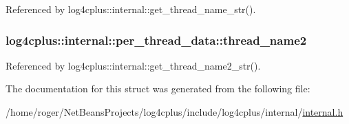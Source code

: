 Referenced by log4cplus\-::internal\-::get\-\_\-thread\-\_\-name\-\_\-str().

\hypertarget{structlog4cplus_1_1internal_1_1per__thread__data_af74a745189668c1ef2a7211c404ea81f}{
\subsubsection[{thread\-\_\-name2}]{ log4cplus\-::internal\-::per\-\_\-thread\-\_\-data\-::thread\-\_\-name2}}\label{structlog4cplus_1_1internal_1_1per__thread__data_af74a745189668c1ef2a7211c404ea81f}


Referenced by log4cplus\-::internal\-::get\-\_\-thread\-\_\-name2\-\_\-str().



The documentation for this struct was generated from the following file\-:\begin{DoxyCompactItemize}
\item 
/home/roger/\-Net\-Beans\-Projects/log4cplus/include/log4cplus/internal/\hyperlink{internal_8h}{internal.\-h}\end{DoxyCompactItemize}
